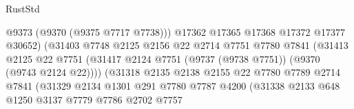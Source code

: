 \begin{lexlean}{RustStd}
\begin{coremodule}
{\begin{coremodule}
{{{{{{{{{{{{{{{{{{{{{{{{{{{{{{{{{{{{{{{                                            @9373
                                            (@9370 (@9375 @7717 @7738)))
                                          @17362
                                          @17365
                                          @17368
                                          @17372
                                          @17377
                                          @30652)
                                        (@31403
                                          @7748
                                          @2125
                                          @2156
                                          @22
                                          @2714
                                          @7751
                                          @7780
                                          @7841
                                          (@31413
                                            @2125
                                            @22
                                            @7751
                                            (@31417
                                              @2124
                                              @7751
                                              (@9737 (@9738 @7751))
                                              (@9370 (@9743 @2124 @22))))
                                          (@31318
                                            @2135
                                            @2138
                                            @2155
                                            @22
                                            @7780
                                            @7789
                                            @2714
                                            @7841
                                            (@31329
                                              @2134
                                              @1301
                                              @291
                                              @7780
                                              @7787
                                              @4200
                                              (@31338
                                                @2133
                                                @648
                                                @1250
                                                @3137
                                                @7779
                                                @7786
                                                @2702
                                                @7757
}}}}}}}}}}}}}}}}}}}}}}}}}}}}}}}}}}}}}}}
\end{coremodule}}
\end{coremodule}
\end{lexlean}
